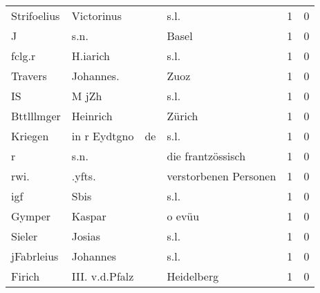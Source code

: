 \documentclass[10pt,a4paper,landscape]{article}
\begin{document}
\begin{longtable}{llllrr}
              Strifoelius &                         Victorinus &             &                                        s.l. &          1 &         0 \\
                        J &                               s.n. &             &                                       Basel &          1 &         0 \\
                   fclg.r &                           H.iarich &             &                                        s.l. &          1 &         0 \\
                  Travers &                          Johannes. &             &                                        Zuoz &          1 &         0 \\
                       IS &                              M jZh &             &                                        s.l. &          1 &         0 \\
               Bttlllmger &                           Heinrich &             &                                      Zürich &          1 &         0 \\
                  Kriegen &                       in r Eydtgno &          de &                                        s.l. &          1 &         0 \\
                        r &                               s.n. &             &                           die frantzössisch &          1 &         0 \\
                     rwi. &                             .yfts. &             &                       verstorbenen Personen &          1 &         0 \\
                      igf &                               Sbis &             &                                        s.l. &          1 &         0 \\
                   Gymper &                             Kaspar &             &                                      o evüu &          1 &         0 \\
                   Sieler &                             Josias &             &                                        s.l. &          1 &         0 \\
               jFabrleius &                           Johannes &             &                                        s.l. &          1 &         0 \\
                   Firich &                     III. v.d.Pfalz &             &                                  Heidelberg &          1 &         0 \\

\end{longtable}
\end{document}
